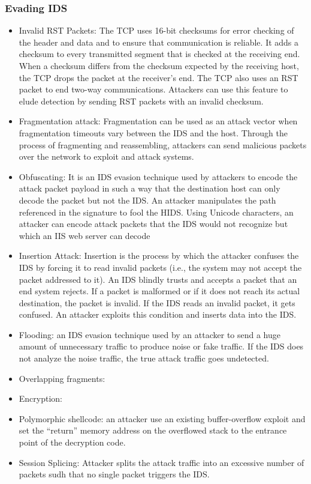 \subsubsection{Evading IDS}
\begin{itemize}
    \item Invalid RST Packets: The TCP uses 16-bit checksums for error checking of the header and data and to ensure that communication is reliable. It adds a checksum to every transmitted segment that is checked at the receiving end. When a checksum differs from the checksum expected by the receiving host, the TCP drops the packet at the receiver's end. The TCP also uses an RST packet to end two-way communications. Attackers can use this feature to elude detection by sending RST packets with an invalid checksum.
    \item Fragmentation attack: Fragmentation can be used as an attack vector when fragmentation timeouts vary between the IDS and the host. Through the process of fragmenting and reassembling, attackers can send malicious packets over the network to exploit and attack systems.
    \item Obfuscating: It is an IDS evasion technique used by attackers to encode the attack packet payload in such a way that the destination host can only decode the packet but not the IDS. An attacker manipulates the path referenced in the signature to fool the HIDS. Using Unicode characters, an attacker can encode attack packets that the IDS would not recognize but which an IIS web server can decode
    \item Insertion Attack: Insertion is the process by which the attacker confuses the IDS by forcing it to read invalid packets (i.e., the system may not accept the packet addressed to it). An IDS blindly trusts and accepts a packet that an end system rejects. If a packet is malformed or if it does not reach its actual destination, the packet is invalid. If the IDS reads an invalid packet, it gets confused. An attacker exploits this condition and inserts data into the IDS.
    \item Flooding: an IDS evasion technique used by an attacker to send a huge amount of unnecessary traffic to produce noise or fake traffic. If the IDS does not analyze the noise traffic, the true attack traffic goes undetected.
    \item Overlapping fragments:
    \item Encryption:
    \item Polymorphic shellcode:  an attacker use an existing buffer-overflow exploit and set the “return” memory address on the overflowed stack to the entrance point of the decryption code.
    \item Session Splicing: Attacker splits the attack traffic into an excessive number of packets sudh that no single packet triggers the IDS.
\end{itemize}
